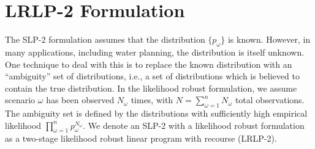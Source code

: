 \documentclass{iserc}
\begin{document}
\section{LRLP-2 Formulation}
\label{sec:lrlp2}

The SLP-2 formulation assumes that the distribution $\{p_\omega\}$ is known.
However, in many applications, including water planning, the distribution is itself unknown.
One technique to deal with this is to replace the known distribution with an ``ambiguity'' set of distributions, i.e., a set of distributions which is believed to contain the true distribution.
In the likelihood robust formulation, we assume scenario $\omega$ has been observed $N_\omega$ times, with $N = \sum_{\omega=1}^n N_\omega$ total observations.
The ambiguity set is defined by the distributions with sufficiently high empirical likelihood $\prod_{\omega=1}^n p_\omega^{N_\omega}$.
We denote an SLP-2 with a likelihood robust formulation as a two-stage likelihood robust linear program with recourse (LRLP-2).
\end{document}
